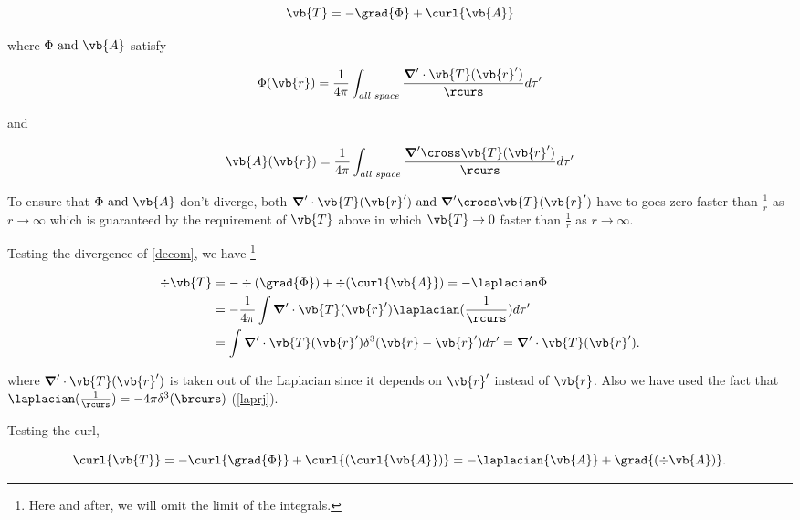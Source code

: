 \documentclass[english,a4paper,12pt]{report}
\begin{document}
\begin{equation}
	\vb{T} = -\grad{\Phi } + \curl{\vb{A} } \label{decom} 
\end{equation}
	
where \(\Phi \text{ and }  \vb{A} \) satisfy

\begin{equation}
	\Phi(\vb{r} ) = \frac{1}{4\pi } \int_{all \text{ } space} \frac{\boldsymbol{\nabla}' \cdot \vb{T} (\vb{r} ')}{\rcurs } d\tau '
\end{equation}

and 

\begin{equation}
	\vb{A} (\vb{r} ) = \frac{1}{4\pi } \int_{all \text{ } space} \frac{\boldsymbol{\nabla}' \cross \vb{T} (\vb{r} ')}{\rcurs } d\tau '
\end{equation}

To ensure that \(\Phi \text{ and }  \vb{A} \) don't diverge, both  \(\boldsymbol{\nabla}' \cdot \vb{T} (\vb{r} ') \text{ and } \boldsymbol{\nabla}' \cross \vb{T} (\vb{r} ')\) have to goes zero faster than \(\frac{1}{r} \) as \(r \rightarrow \infty\) which is guaranteed by the requirement of \(\vb{T} \) above in which \(\vb{T} \rightarrow 0 \) faster than \(\frac{1}{r} \) as \(r \rightarrow  \infty\).

Testing the divergence of \cref{decom}, we have \footnote{Here and after, we will omit the limit of the integrals.}

\begin{equation}
	\begin{aligned}
		\div{\vb{T} } &= -\div{(\grad{\Phi} )} + \div{(\curl{\vb{A} } )} = -\laplacian \Phi \\ 
		&= -\frac{1}{4\pi } \int \boldsymbol{\nabla}' \cdot \vb{T} (\vb{r} ') \laplacian (\frac{1}{\rcurs } ) d\tau ' \\ 
		&= \int \boldsymbol{\nabla}' \cdot \vb{T} (\vb{r} ') \delta ^3(\vb{r} -\vb{r} ')d\tau ' = \boldsymbol{\nabla}' \cdot \vb{T} (\vb{r} '). \label{divT}  
	\end{aligned}
\end{equation}

where \(\boldsymbol{\nabla}' \cdot \vb{T} (\vb{r} ')\) is taken out of the Laplacian since it depends on \(\vb{r} '\) instead of \(\vb{r} \). Also we have used the fact that \(\laplacian (\frac{1}{\rcurs }) = -4\pi \delta ^3(\brcurs )\) (\cref{laprj}).

Testing the curl,

\begin{equation}
	 \curl{\vb{T}} = -\curl{\grad{\Phi}} + \curl{(\curl{\vb{A}})} = -\laplacian{\vb{A}} + \grad{(\div{\vb{A}})}. \label{int1} 
\end{equation}
\end{document}
